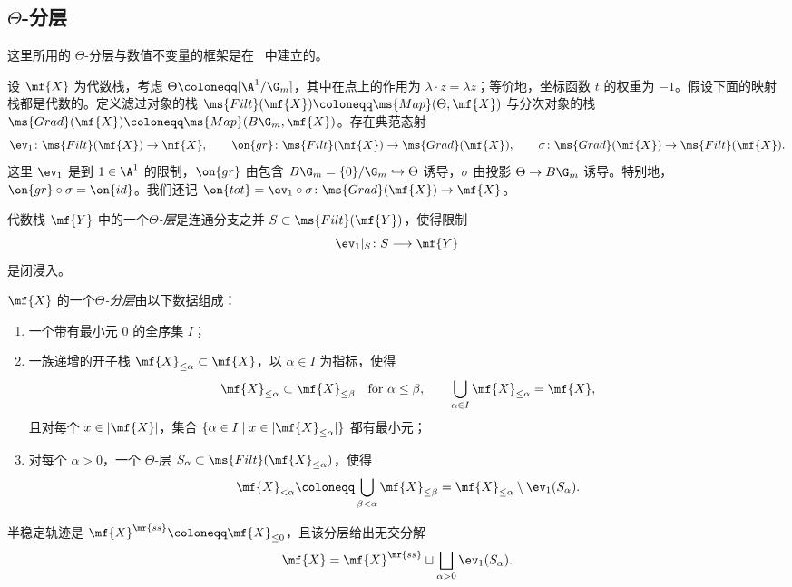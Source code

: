 \subsection{\(\Theta\)-分层}%
\label{sub:Theta-stratifications}

这里所用的 \(\Theta\)-分层与数值不变量的框架是在~\cite{HLinstability} 中建立的。

设 \(\mf{X}\) 为代数栈，考虑 \(\Theta\coloneqq[\A^1/\G_m]\)，其中在点上的作用为 \(\lambda\cdot z=\lambda z\)；等价地，坐标函数 \(t\) 的权重为 \(-1\)。假设下面的映射栈都是代数的。定义滤过对象的栈 \(\ms{Filt}(\mf{X})\coloneqq\ms{Map}(\Theta,\mf{X})\) 与分次对象的栈 \(\ms{Grad}(\mf{X})\coloneqq\ms{Map}(B\G_m,\mf{X})\)。存在典范态射
\[
    \ev_1\colon\ms{Filt}(\mf{X})\to\mf{X},
    \qquad
    \on{gr}\colon\ms{Filt}(\mf{X})\to\ms{Grad}(\mf{X}),
    \qquad
    \sigma\colon\ms{Grad}(\mf{X})\to\ms{Filt}(\mf{X}).
\]
这里 \(\ev_1\) 是到 \(1\in\A^1\) 的限制，\(\on{gr}\) 由包含 \(B\G_m=\{0\}/\G_m\hookrightarrow\Theta\) 诱导，\(\sigma\) 由投影 \(\Theta\to B\G_m\) 诱导。特别地，\(\on{gr}\circ\sigma=\on{id}\)。我们还记 \(\on{tot}=\ev_1\circ\sigma\colon\ms{Grad}(\mf{X})\to\mf{X}\)。

\begin{defn}
    代数栈 \(\mf{Y}\) 中的一个\textit{\(\Theta\)-层}是连通分支之并 \(S\subset\ms{Filt}(\mf{Y})\)，使得限制
    \[
        \ev_1|_S\colon S\longrightarrow\mf{Y}
    \]
    是闭浸入。

    \(\mf{X}\) 的一个\textit{\(\Theta\)-分层}由以下数据组成：
    \begin{enumerate}
        \item 一个带有最小元 \(0\) 的全序集 \(I\)；
        \item 一族递增的开子栈 \(\mf{X}_{\leq\alpha}\subset\mf{X}\)，以 \(\alpha\in I\) 为指标，使得
        \[
            \mf{X}_{\leq\alpha}\subset\mf{X}_{\leq\beta}
            \quad\text{for }\alpha\leq\beta,
            \qquad
            \bigcup_{\alpha\in I}\mf{X}_{\leq\alpha}=\mf{X},
        \]
        且对每个 \(x\in|\mf{X}|\)，集合 \(\{\alpha\in I\mid x\in|\mf{X}_{\leq\alpha}|\}\) 都有最小元；
        \item 对每个 \(\alpha>0\)，一个 \(\Theta\)-层 \(S_\alpha\subset\ms{Filt}(\mf{X}_{\leq\alpha})\)，使得
        \[
            \mf{X}_{<\alpha}
            \coloneqq
            \bigcup_{\beta<\alpha}\mf{X}_{\leq\beta}
            =
            \mf{X}_{\leq\alpha}\setminus\ev_1(S_\alpha).
        \]
    \end{enumerate}
    半稳定轨迹是 \(\mf{X}^{\mr{ss}}\coloneqq\mf{X}_{\leq0}\)，且该分层给出无交分解
    \[
        \mf{X}
        =
        \mf{X}^{\mr{ss}}
        \sqcup
        \bigsqcup_{\alpha>0}\ev_1(S_\alpha).
    \]
\end{defn}

